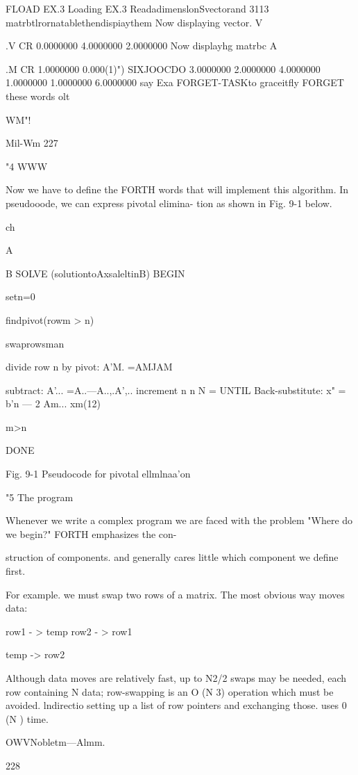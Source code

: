 FLOAD EX.3 Loading EX.3
ReadadimenslonSvectorand 3113 matrbtlrornatablethendispiaythem
Now displaying vector.
V{ .V CR
0.0000000
4.0000000
2.0000000
Now displayhg matrbc
A{{ .M CR
1.0000000 0.000(1)") SIXJOOCDO
3.0000000 2.0000000 4.0000000
1.0000000 1.0000000 6.0000000
say Exa FORGET-TASKto graceitfly FORGET these words olt

WM"!

Mil-Wm 227

"4 WWW

Now we have to deﬁne the FORTH words that will implement
this algorithm. In pseudooode, we can express pivotal elimina-
tion as shown in Fig. 9-1 below.

 

ch

 

 

 

A{{ B{ }}SOLVE (solutiontoAxsaleltinB)
BEGIN

setn=0

ﬁndpivot(rowm > n)

swaprowsman

divide row n by pivot: A'M. =AMJAM

subtract: A'... =A..—A..,.A',..
increment n
n N =
UNTIL
Back-substitute: x" = b'n — 2 Am... xm(12)

m>n

DONE

 

 

Fig. 9-1 Pseudocode for pivotal ellmlnaa'on

"5 The program

Whenever we write a complex program we are faced with the
problem "Where do we begin?" FORTH emphasizes the con-

struction of components. and generally cares little which component
we deﬁne ﬁrst.

For example. we must swap two rows of a matrix. The most
obvious way moves data:

row1 - > temp
row2 - > row1

temp -> row2

Although data moves are relatively fast, up to N2/2 swaps may be
needed, each row containing N data; row-swapping is an O (N 3)
operation which must be avoided. lndirectio setting up a list of
row pointers and exchanging those. uses 0 (N ) time.

OWVNobletm—Almm.

228

}}}}

